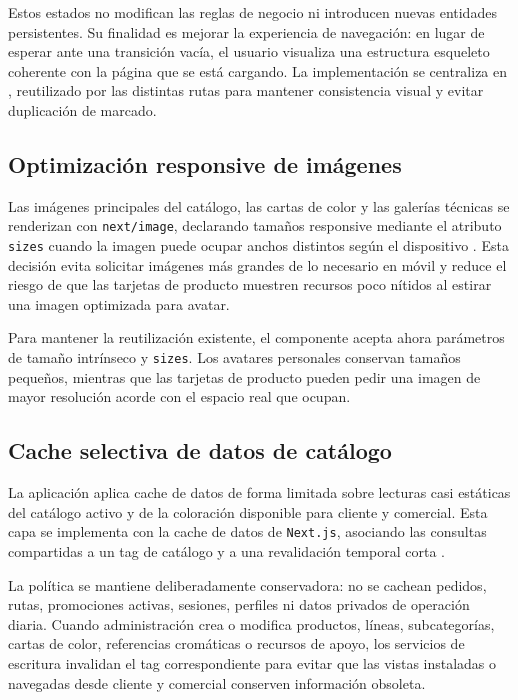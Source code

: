 Estos estados no modifican las reglas de negocio ni introducen nuevas entidades persistentes. Su finalidad es mejorar la experiencia de navegación: en lugar de esperar ante una transición vacía, el usuario visualiza una estructura esqueleto coherente con la página que se está cargando. La implementación se centraliza en , reutilizado por las distintas rutas para mantener consistencia visual y evitar duplicación de marcado.

\subsection{Optimización responsive de imágenes}

Las imágenes principales del catálogo, las cartas de color y las galerías técnicas se renderizan con \texttt{next/image}, declarando tamaños responsive mediante el atributo \texttt{sizes} cuando la imagen puede ocupar anchos distintos según el dispositivo \citep{nextjsimage2026}. Esta decisión evita solicitar imágenes más grandes de lo necesario en móvil y reduce el riesgo de que las tarjetas de producto muestren recursos poco nítidos al estirar una imagen optimizada para avatar.

Para mantener la reutilización existente, el componente  acepta ahora parámetros de tamaño intrínseco y \texttt{sizes}. Los avatares personales conservan tamaños pequeños, mientras que las tarjetas de producto pueden pedir una imagen de mayor resolución acorde con el espacio real que ocupan.

\subsection{Cache selectiva de datos de catálogo}

La aplicación aplica cache de datos de forma limitada sobre lecturas casi estáticas del catálogo activo y de la coloración disponible para cliente y comercial. Esta capa se implementa con la cache de datos de \texttt{Next.js}, asociando las consultas compartidas a un tag de catálogo y a una revalidación temporal corta \citep{nextjscaching2026}.

La política se mantiene deliberadamente conservadora: no se cachean pedidos, rutas, promociones activas, sesiones, perfiles ni datos privados de operación diaria. Cuando administración crea o modifica productos, líneas, subcategorías, cartas de color, referencias cromáticas o recursos de apoyo, los servicios de escritura invalidan el tag correspondiente para evitar que las vistas instaladas o navegadas desde cliente y comercial conserven información obsoleta.

